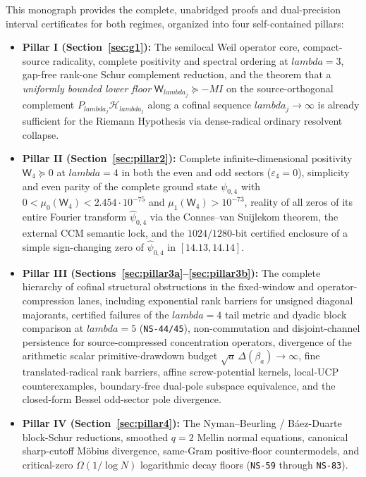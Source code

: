 \documentclass[11pt]{article}
\def\lambda{lambda}%
\theoremstyle{remark}
\begin{document}
This monograph provides the complete, unabridged proofs and dual-precision interval certificates for both regimes, organized into four self-contained pillars:
\begin{itemize}
\item \textbf{Pillar I (Section~\ref{sec:g1}):} The semilocal Weil operator core, compact-source radicality, complete positivity and spectral ordering at $\lambda=3$, gap-free rank-one Schur complement reduction, and the theorem that a \emph{uniformly bounded lower floor} $\mathsf W_{\lambda_j}\succeq -M I$ on the source-orthogonal complement $P_{\lambda_j}\mathcal H_{\lambda_j}$ along a cofinal sequence $\lambda_j\to\infty$ is already sufficient for the Riemann Hypothesis via dense-radical ordinary resolvent collapse.
\item \textbf{Pillar II (Section~\ref{sec:pillar2}):} Complete infinite-dimensional positivity $\mathsf W_4\succeq 0$ at $\lambda=4$ in both the even and odd sectors ($\varepsilon_4=0$), simplicity and even parity of the complete ground state $\psi_{0,4}$ with $0<\mu_0(\mathsf W_4)<2.454\cdot 10^{-75}$ and $\mu_1(\mathsf W_4)>10^{-73}$, reality of all zeros of its entire Fourier transform $\widehat{\psi}_{0,4}$ via the Connes--van Suijlekom theorem, the external CCM semantic lock, and the $1024/1280$-bit certified enclosure of a simple sign-changing zero of $\widehat{\psi}_{0,4}$ in $[14.13,14.14]$.
\item \textbf{Pillar III (Sections~\ref{sec:pillar3a}--\ref{sec:pillar3b}):} The complete hierarchy of cofinal structural obstructions in the fixed-window and operator-compression lanes, including exponential rank barriers for unsigned diagonal majorants, certified failures of the $\lambda=4$ tail metric and dyadic block comparison at $\lambda=5$ (\texttt{NS-44/45}), non-commutation and disjoint-channel persistence for source-compressed concentration operators, divergence of the arithmetic scalar primitive-drawdown budget $\sqrt{a}\,\Delta(\beta_a)\to\infty$, fine translated-radical rank barriers, affine screw-potential kernels, local-UCP counterexamples, boundary-free dual-pole subspace equivalence, and the closed-form Bessel odd-sector pole divergence.
\item \textbf{Pillar IV (Section~\ref{sec:pillar4}):} The Nyman--Beurling / B\'aez-Duarte block-Schur reductions, smoothed $q=2$ Mellin normal equations, canonical sharp-cutoff Möbius divergence, same-Gram positive-floor countermodels, and critical-zero $\Omega(1/\log N)$ logarithmic decay floors (\texttt{NS-59} through \texttt{NS-83}).
\end{itemize}
\end{document}
